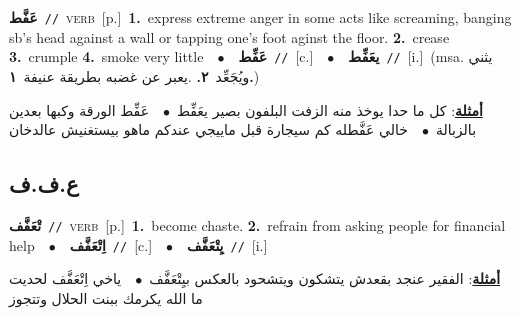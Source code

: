 \documentclass[10pt,a4paper,twoside]{article} %
\begin{document}
\begin{multicols}{2}
{\setlength\topsep{0pt}\textbf{\foreignlanguage{arabic}{عَفَّط}}\ {\color{gray}\texttt{//}\color{black}}\ \textsc{verb}\ [p.]\ \textbf{1.}~express extreme anger in some acts like screaming, banging sb's head against a wall or tapping one's foot aginst the floor.  \textbf{2.}~crease  \textbf{3.}~crumple  \textbf{4.}~smoke very little\ \ $\bullet$\ \ \setlength\topsep{0pt}\textbf{\foreignlanguage{arabic}{عَفِّط}}\ {\color{gray}\texttt{//}\color{black}}\ [c.]\ \ $\bullet$\ \ \setlength\topsep{0pt}\textbf{\foreignlanguage{arabic}{يعَفِّط}}\ {\color{gray}\texttt{//}\color{black}}\ [i.]\ \color{gray}(msa. \foreignlanguage{arabic}{يثني ويُجَعِّد}~\foreignlanguage{arabic}{\textbf{٢.}}  .\foreignlanguage{arabic}{يعبر عن غضبه بطريقة عنيفة}~\foreignlanguage{arabic}{\textbf{١.}})\color{black}\  \begin{flushright}\color{gray}\foreignlanguage{arabic}{\textbf{\underline{\foreignlanguage{arabic}{أمثلة}}}: كل ما حدا يوخذ منه الزفت البلفون بصير يعَفِّط\ $\bullet$\ \  عَفِّط الورقة وكبها بعدين بالزبالة\ $\bullet$\ \  خالي عَفَّطله كم سيجارة قبل ماييجي عندكم ماهو بيستغنيش عالدخان}\end{flushright}\color{black}} \vspace{2mm}

\vspace{-3mm}
\subsection*{\color{blue}\foreignlanguage{arabic}{ع.ف.ف}\color{blue}{}} 

{\setlength\topsep{0pt}\textbf{\foreignlanguage{arabic}{تْعَفَّف}}\ {\color{gray}\texttt{//}\color{black}}\ \textsc{verb}\ [p.]\ \textbf{1.}~become chaste.  \textbf{2.}~refrain from asking people for financial help\ \ $\bullet$\ \ \setlength\topsep{0pt}\textbf{\foreignlanguage{arabic}{اِتْعَفَّف}}\ {\color{gray}\texttt{//}\color{black}}\ [c.]\ \ $\bullet$\ \ \setlength\topsep{0pt}\textbf{\foreignlanguage{arabic}{يِتْعَفَّف}}\ {\color{gray}\texttt{//}\color{black}}\ [i.]\  \begin{flushright}\color{gray}\foreignlanguage{arabic}{\textbf{\underline{\foreignlanguage{arabic}{أمثلة}}}: الفقير عنجد بقعدش يتشكون ويتشحود بالعكس بيِتْعَفَّف\ $\bullet$\ \  ياخي اِتْعَفَّف لحديت ما الله يكرمك ببنت الحلال وتتجوز}\end{flushright}\color{black}} \vspace{2mm}


\end{multicols}
\end{document}
